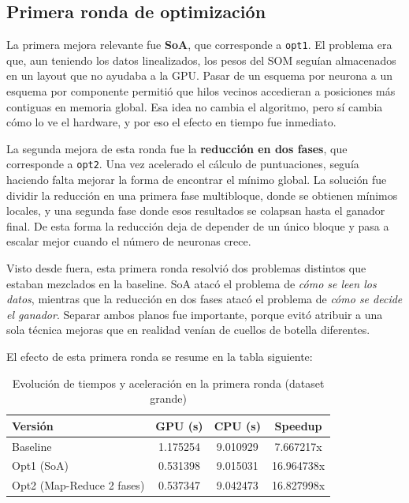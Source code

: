 \documentclass[11pt,a4paper]{article}
\begin{document}
\subsection{Primera ronda de optimización}

La primera mejora relevante fue \textbf{SoA}, que corresponde a \texttt{opt1}. El problema era que, aun teniendo los datos linealizados, los pesos del SOM seguían almacenados en un layout que no ayudaba a la GPU. Pasar de un esquema por neurona a un esquema por componente permitió que hilos vecinos accedieran a posiciones más contiguas en memoria global. Esa idea no cambia el algoritmo, pero sí cambia cómo lo ve el hardware, y por eso el efecto en tiempo fue inmediato.

La segunda mejora de esta ronda fue la \textbf{reducción en dos fases}, que corresponde a \texttt{opt2}. Una vez acelerado el cálculo de puntuaciones, seguía haciendo falta mejorar la forma de encontrar el mínimo global. La solución fue dividir la reducción en una primera fase multibloque, donde se obtienen mínimos locales, y una segunda fase donde esos resultados se colapsan hasta el ganador final. De esta forma la reducción deja de depender de un único bloque y pasa a escalar mejor cuando el número de neuronas crece.

Visto desde fuera, esta primera ronda resolvió dos problemas distintos que estaban mezclados en la baseline. SoA atacó el problema de \emph{cómo se leen los datos}, mientras que la reducción en dos fases atacó el problema de \emph{cómo se decide el ganador}. Separar ambos planos fue importante, porque evitó atribuir a una sola técnica mejoras que en realidad venían de cuellos de botella diferentes.

El efecto de esta primera ronda se resume en la tabla siguiente:

\begin{table}[H]
\centering
\caption{Evolución de tiempos y aceleración en la primera ronda (dataset grande)}
\label{tab:tiempos-primera-grande}
\begin{tabular}{lccc}
\toprule
\textbf{Versión} & \textbf{GPU (s)} & \textbf{CPU (s)} & \textbf{Speedup} \\
\midrule
Baseline & 1.175254 & 9.010929 & 7.667217x \\
Opt1 (SoA) & 0.531398 & 9.015031 & 16.964738x \\
Opt2 (Map-Reduce 2 fases) & 0.537347 & 9.042473 & 16.827998x \\
\bottomrule
\end{tabular}
\end{table}
\end{document}
